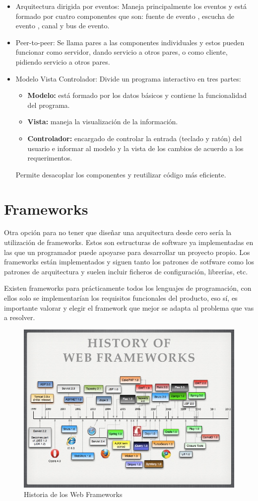 \documentclass[12pt]{report} %
\begin{document}
\begin{itemize}
\begin{itemize}
 	\end{itemize}
 	\item Arquitectura dirigida por eventos: Maneja principalmente los eventos y está formado por cuatro componentes que son: fuente de evento , escucha de evento , canal y bus de evento.
 	\item Peer-to-peer: Se llama pares a las componentes individuales y estos pueden funcionar como servidor, dando servicio a otros pares, o como cliente, pidiendo servicio a otros pares.
 	\item Modelo Vista Controlador: Divide un programa interactivo en tres partes:
 		\begin{itemize}
 			\item \textbf{Modelo:} está formado por los datos básicos y contiene la funcionalidad del programa. 
 			\item \textbf{Vista:} maneja la visualización de la información. 
 			\item \textbf{Controlador:} encargado de controlar la entrada (teclado y ratón) del usuario e informar al modelo y la vista de los cambios de acuerdo a los requerimentos.
 		\end{itemize}
 	Permite desacoplar los componentes y reutilizar código más eficiente. 
 \end{itemize}

\section{Frameworks}
 Otra opción para no tener que diseñar una arquitectura desde cero sería la utilización de frameworks. Estos son estructuras de software ya implementadas en las que un programador puede apoyarse para desarrollar un proyecto propio. Los frameworks están implementados y siguen tanto los patrones de sotfware como los patrones de arquitectura y suelen incluir ficheros de configuración, librerías, etc.
 
 Existen frameworks para prácticamente todos los lenguajes de programación, con ellos solo se implementarían los requisitos funcionales del producto, eso sí, es importante valorar y elegir el framework que mejor se adapta al problema que vas a resolver.
 
  \begin{figure}
 	\centering
 	\includegraphics[width=0.7\linewidth]{imagenes/the-future-of-web-frameworks-11-728}
 	\caption{Historia de los Web Frameworks}
 	\label{fig:webFrameworks}
 \end{figure}
\end{document}
